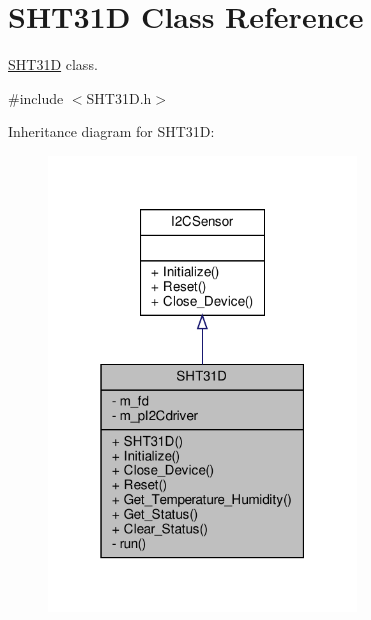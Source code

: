 \hypertarget{classSHT31D}{}\section{S\+H\+T31D Class Reference}
\label{classSHT31D}


\hyperlink{classSHT31D}{S\+H\+T31D} class.  




{\ttfamily \#include $<$S\+H\+T31\+D.\+h$>$}



Inheritance diagram for S\+H\+T31D\+:\nopagebreak
\begin{figure}[H]
\begin{center}
\leavevmode
\includegraphics[width=232pt]{classSHT31D__inherit__graph}
\end{center}
\end{figure}


